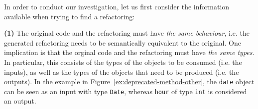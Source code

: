 \documentclass[sigconf,review,anonymous]{acmart}
\begin{document}

In order to conduct our investigation, let us first  consider the information available when trying to find a refactoring:

{\bf (1)} The original code and the refactoring must have {\em the same behaviour}, i.e. 
the generated refactoring needs to be semantically equivalent to the original.
One implication is that the orginal code and the refactoring must have {\em the same types}. In particular, this consists of the types of the objects to be consumed (i.e. the inputs), as well as the types of the objects that need to be produced (i.e. the outputs). In the example in Figure~\ref{ex:deprecated-method-other}, the \texttt{date} object can be seen as an input with type \texttt{Date}, whereas \texttt{hour} of type \texttt{int} is considered an output.

\end{document}
